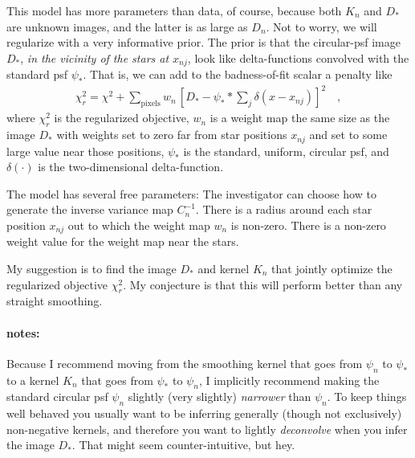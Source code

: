 \documentclass[12pt]{article}
\begin{document}
This model has more parameters than data, of course, because both
$K_n$ and $D_\ast$ are unknown images, and the latter is as large as
$D_n$.  Not to worry, we will regularize with a very informative
prior.  The prior is that the circular-psf image $D_\ast$, \emph{in
  the vicinity of the stars at $x_{nj}$}, look like delta-functions
convolved with the standard psf $\psi_\ast$.  That is, we can add to
the badness-of-fit scalar a penalty like
\begin{eqnarray}\displaystyle
\chi_r^2 = \chi^2 + \sum_{\mathrm{pixels}} w_n\,[D_\ast - \psi_\ast \ast \sum_j \delta(x - x_{nj})]^2 \quad,
\end{eqnarray}
where $\chi_r^2$ is the regularized objective, $w_n$ is a weight map
the same size as the image $D_\ast$ with weights set to zero far from
star positions $x_{nj}$ and set to some large value near those
positions, $\psi_\ast$ is the standard, uniform, circular psf, and
$\delta(\cdot)$ is the two-dimensional delta-function.

The model has several free parameters: The investigator can choose how
to generate the inverse variance map $C_n^{-1}$.  There is a radius
around each star position $x_{nj}$ out to which the weight map $w_n$
is non-zero.  There is a non-zero weight value for the weight map near
the stars.

My suggestion is to find the image $D_\ast$ and kernel $K_n$ that
jointly optimize the regularized objective $\chi_r^2$.  My conjecture
is that this will perform better than any straight smoothing.

\paragraph{notes:}
Because I recommend moving from the smoothing kernel that goes from
$\psi_n$ to $\psi_\ast$ to a kernel $K_n$ that goes from $\psi_\ast$
to $\psi_n$, I implicitly recommend making the standard circular psf
$\psi_n$ slightly (very slightly) \emph{narrower} than $\psi_n$.  To
keep things well behaved you usually want to be inferring generally
(though not exclusively) non-negative kernels, and therefore you want
to lightly \emph{deconvolve} when you infer the image $D_\ast$.  That
might seem counter-intuitive, but hey.
\end{document}
